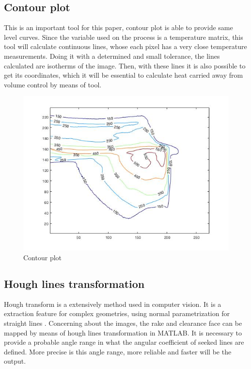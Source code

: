 	\subsection{Contour plot}
	\label{ch:seccontour}
	This is an important tool for this paper, contour plot is able to provide same level curves. Since the variable used on the process is a temperature matrix, this tool will calculate continuous lines, whose each pixel has a very close temperature measurements. Doing it with a determined and small tolerance, the lines calculated are isotherms of the image. Then, with these lines it is also possible to get its coordinates, which it will be essential to calculate heat carried away from volume control by means of tool.

	\begin{figure}[H]
		\centering
		\captionsetup{justification=centering}
		\includegraphics[scale=0.75]{Cap4/contour.jpg}
		\caption{Contour plot}
		\label{fig:contour}
	\end{figure}

	\subsection{Hough lines transformation}
	\label{ch:sechough}
	Hough transform is a extensively method used in computer vision. It is a extraction feature for complex geometries, using normal parametrization for straight lines \cite{duda1972use}. Concerning about the images, the rake and clearance face can be mapped by means of hough lines transformation in MATLAB. It is necessary to provide a probable angle range in what the angular coefficient of seeked lines are defined. More precise is this angle range, more reliable and faster will be the output.

